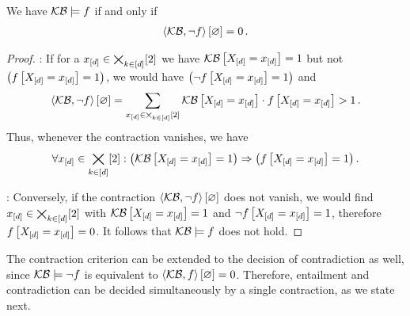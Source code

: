 \begin{theorem}\label{the:contCriterionLogEntailment}
	We have $\mathcal{KB}\models f$ if and only if
	\begin{align*}
		\left\langle \mathcal{KB},\lnot f\right\rangle \left[ \varnothing \right] = 0 \, .
	\end{align*}
\end{theorem}
\begin{proof}
	\proofleftsymbol:
	If for a $x_{[d]}\in\bigtimes_{k\in[d]}[2]$ we have $\mathcal{KB}\left[X_{[d]}=x_{[d]}\right]=1$ but not $\big(f\left[X_{[d]}=x_{[d]}\right]=1\big)$, we would have $\big(\lnot f\left[X_{[d]}=x_{[d]}\right]=1\big)$ and
	\begin{align*}
		\left\langle \mathcal{KB},\lnot f\right\rangle \left[ \varnothing \right] =
		\sum_{x_{[d]}\in\bigtimes_{k\in[d]}[2]} \mathcal{KB}\left[X_{[d]}=x_{[d]}\right] \cdot f\left[X_{[d]}=x_{[d]}\right] > 1 \, .
	\end{align*}
	Thus, whenever the contraction vanishes, we have
	\begin{align*}
		\forall{x_{[d]}\in\bigtimes_{k\in[d]}[2]}:{\left(\mathcal{KB}\left[X_{[d]}=x_{[d]}\right]=1\right)\Rightarrow\left(f\left[X_{[d]}=x_{[d]}\right]=1\right)} \, .
	\end{align*}

	\proofrightsymbol:
	Conversely, if the contraction $\left\langle \mathcal{KB},\lnot f\right\rangle \left[ \varnothing \right]$ does not vanish, we would find $x_{[d]}\in\bigtimes_{k\in[d]}[2]$ with $\mathcal{KB}\left[X_{[d]}=x_{[d]}\right]=1$ and $\lnot f\left[X_{[d]}=x_{[d]}\right]=1$, therefore $f\left[X_{[d]}=x_{[d]}\right]=0$.
	It follows that $\mathcal{KB}\models f$ does not hold.
\end{proof}


The contraction criterion can be extended to the decision of contradiction as well, since $\mathcal{KB}\models\lnot f$ is equivalent to $\left\langle \mathcal{KB},f\right\rangle \left[ \varnothing \right]=0$.
Therefore, entailment and contradiction can be decided simultaneously by a single contraction, as we state next.

